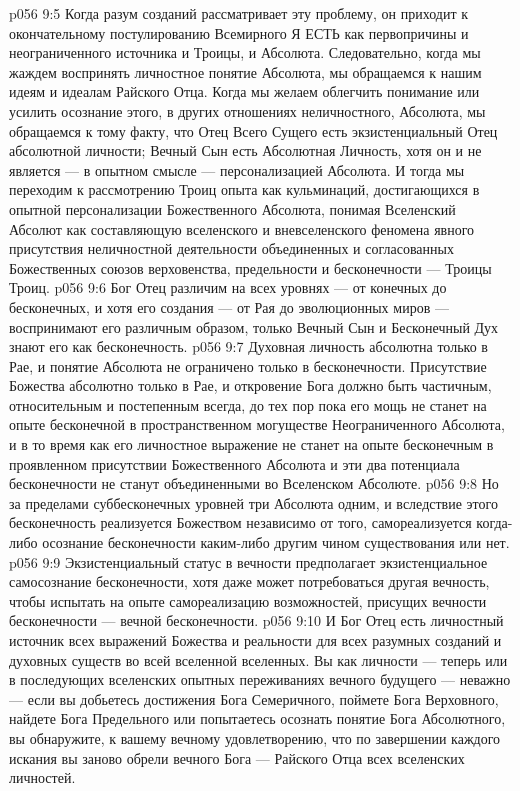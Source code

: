 \vs p056 9:5 Когда разум созданий рассматривает эту проблему, он приходит к окончательному постулированию Всемирного Я ЕСТЬ как первопричины и неограниченного источника и Троицы, и Абсолюта. Следовательно, когда мы жаждем воспринять личностное понятие Абсолюта, мы обращаемся к нашим идеям и идеалам Райского Отца. Когда мы желаем облегчить понимание или усилить осознание этого, в других отношениях неличностного, Абсолюта, мы обращаемся к тому факту, что Отец Всего Сущего есть экзистенциальный Отец абсолютной личности; Вечный Сын есть Абсолютная Личность, хотя он и не является --- в опытном смысле --- персонализацией Абсолюта. И тогда мы переходим к рассмотрению Троиц опыта как кульминаций, достигающихся в опытной персонализации Божественного Абсолюта, понимая Вселенский Абсолют как составляющую вселенского и вневселенского феномена явного присутствия неличностной деятельности объединенных и согласованных Божественных союзов верховенства, предельности и бесконечности --- Троицы Троиц.
\vs p056 9:6 \pc Бог Отец различим на всех уровнях --- от конечных до бесконечных, и хотя его создания --- от Рая до эволюционных миров --- воспринимают его различным образом, только Вечный Сын и Бесконечный Дух знают его как бесконечность.
\vs p056 9:7 Духовная личность абсолютна только в Рае, и понятие Абсолюта не ограничено только в бесконечности. Присутствие Божества абсолютно только в Рае, и откровение Бога должно быть частичным, относительным и постепенным всегда, до тех пор пока его мощь не станет на опыте бесконечной в пространственном могуществе Неограниченного Абсолюта, и в то время как его личностное выражение не станет на опыте бесконечным в проявленном присутствии Божественного Абсолюта и эти два потенциала бесконечности не станут объединенными во Вселенском Абсолюте.
\vs p056 9:8 Но за пределами суббесконечных уровней три Абсолюта  одним, и вследствие этого бесконечность реализуется Божеством независимо от того, самореализуется когда\hyp{}либо осознание бесконечности каким\hyp{}либо другим чином существования или нет.
\vs p056 9:9 Экзистенциальный статус в вечности предполагает экзистенциальное самосознание бесконечности, хотя даже может потребоваться другая вечность, чтобы испытать на опыте самореализацию возможностей, присущих вечности бесконечности --- вечной бесконечности.
\vs p056 9:10 \pc И Бог Отец есть личностный источник всех выражений Божества и реальности для всех разумных созданий и духовных существ во всей вселенной вселенных. Вы как личности --- теперь или в последующих вселенских опытных переживаниях вечного будущего --- неважно --- если вы добьетесь достижения Бога Семеричного, поймете Бога Верховного, найдете Бога Предельного или попытаетесь осознать понятие Бога Абсолютного, вы обнаружите, к вашему вечному удовлетворению, что по завершении каждого искания вы заново обрели вечного Бога --- Райского Отца всех вселенских личностей.
